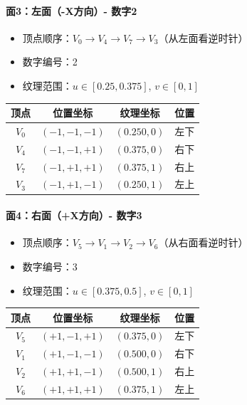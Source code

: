 \documentclass[12pt,a4paper]{article}
\begin{document}
\paragraph{面3：左面（-X方向）- 数字2}

\begin{itemize}
    \item 顶点顺序：$V_0 \to V_4 \to V_7 \to V_3$（从左面看逆时针）
    \item 数字编号：2
    \item 纹理范围：$u \in [0.25, 0.375]$, $v \in [0, 1]$
\end{itemize}

\begin{table}[H]
\centering
\begin{tabular}{|c|c|c|c|}
\hline
\textbf{顶点} & \textbf{位置坐标} & \textbf{纹理坐标} & \textbf{位置} \\
\hline
$V_0$ & $(-1, -1, -1)$ & $(0.250, 0)$ & 左下 \\
$V_4$ & $(-1, -1, +1)$ & $(0.375, 0)$ & 右下 \\
$V_7$ & $(-1, +1, +1)$ & $(0.375, 1)$ & 右上 \\
$V_3$ & $(-1, +1, -1)$ & $(0.250, 1)$ & 左上 \\
\hline
\end{tabular}
\end{table}

\paragraph{面4：右面（+X方向）- 数字3}

\begin{itemize}
    \item 顶点顺序：$V_5 \to V_1 \to V_2 \to V_6$（从右面看逆时针）
    \item 数字编号：3
    \item 纹理范围：$u \in [0.375, 0.5]$, $v \in [0, 1]$
\end{itemize}

\begin{table}[H]
\centering
\begin{tabular}{|c|c|c|c|}
\hline
\textbf{顶点} & \textbf{位置坐标} & \textbf{纹理坐标} & \textbf{位置} \\
\hline
$V_5$ & $(+1, -1, +1)$ & $(0.375, 0)$ & 左下 \\
$V_1$ & $(+1, -1, -1)$ & $(0.500, 0)$ & 右下 \\
$V_2$ & $(+1, +1, -1)$ & $(0.500, 1)$ & 右上 \\
$V_6$ & $(+1, +1, +1)$ & $(0.375, 1)$ & 左上 \\
\hline
\end{tabular}
\end{table}
\end{document}
